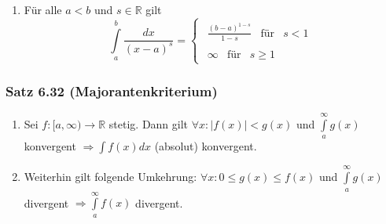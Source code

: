 \begin{enumerate}
\begin{enumerate}
\item Für alle $a<b$ und $s\in\mathbb{R}$ gilt \[\int\limits_a^b {\frac{{dx}}{{{{(x - a)}^s}}}}  = \left\{ {\begin{array}{*{20}{c}}
{\begin{array}{*{20}{c}}
{\frac{{{{(b - a)}^{1 - s}}}}{{1 - s}}}&\text{für}&{s < 1}
\end{array}}\\
{\begin{array}{*{20}{c}}
\infty &{{\text{für}}}&{s \ge 1}
\end{array}}
\end{array}} \right.\]
\end{enumerate}
\end{enumerate}
\subsubsection*{Satz 6.32 (Majorantenkriterium)}
\begin{enumerate}[\indent a)]
\item Sei $f:\lbrack a,\infty )\rightarrow\mathbb{R}$ stetig. Dann gilt $\forall x:\left| f(x)\right| <g(x)$ und $\int\limits_a^\infty  {g(x)}$ konvergent $\Rightarrow \int {f(x)dx} $ (absolut) konvergent.
\item Weiterhin gilt folgende Umkehrung: $\forall x:0\leq g(x)\leq f(x)$ und $\int\limits_a^\infty  {g(x)}$ divergent $\Rightarrow \int\limits_a^\infty  {f(x)}$ divergent.
\end{enumerate}


